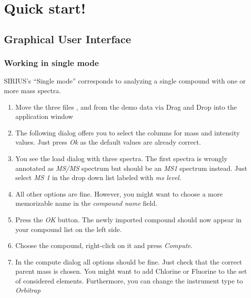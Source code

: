 \documentclass[letterpaper,10pt,openany,oneside]{sphinxmanual}
\newcommand\gui[1]{\textsl{\guilsinglleft#1\guilsinglright\xspace}}
\begin{document}
\chapter{Quick start!}
\section{Graphical User Interface}
\subsection{Working in single mode}
\label{gui:working-in-single-mode}

SIRIUS's ``Single mode'' corresponds to analyzing a single compound with
one or more mass spectra.

\begin{enumerate}
	\item {} 
	Move the three files ,  and  from the demo data via Drag and Drop into the application window
	
	\item {} 
	The following dialog offers you to select the columns for mass and intensity values. Just press \gui{Ok} as the default values are already correct.
	
	\item {} 
	You see the load dialog with three spectra. The first spectra is wrongly
	annotated as \emph{MS/MS} spectrum but should be an \emph{MS1} spectrum
	instead. Just select \gui{MS 1} in the drop down list labeled with \gui{ms
		level}.
	
	\item {} 
	All other options are fine. However, you might want to choose a more memorizable name in the \gui{compound name} field.
	
	\item {} 
	Press the \gui{OK} button. The newly imported compound should now appear in your compound list on the left side.
	
	\item {} 
	Choose the compound, right-click on it and press \gui{Compute}.
	
	\item {} 
	In the compute dialog all options should be fine. Just check that the correct parent mass is chosen. You might want to add Chlorine or Fluorine to the set of considered elements. Furthermore, you can change the instrument type to \gui{Orbitrap}
	

\end{enumerate}
\end{document}

